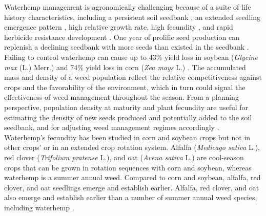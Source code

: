 \documentclass[
]{article}
\begin{document}
Waterhemp management is agronomically challenging because of a suite of life history characteristics, including a persistent soil seedbank \citep{davisWeedSeedPools2008}, an extended seedling emergence pattern \citep{buhlerEmergencePersistenceSeed2001}, high relative growth rate, high fecundity \citep{heneghanGrowthDevelopmentFive2017}, and rapid herbicide resistance development \citep{tranelHerbicideResistanceAmaranthus2021}. One year of prolific seed production can replenish a declining seedbank with more seeds than existed in the seedbank \citep{davisWeedSeedPools2008}. Failing to control waterhemp can cause up to 43\% yield loss in soybean (\emph{Glycine max} (L.) Merr.) \citep{hagerCommonWaterhempAmaranthus2002a} and 74\% yield loss in corn (\emph{Zea mays} L.) \citep{steckelCommonWaterhempAmaranthus2004}. The accumulated mass and density of a weed population reflect the relative competitiveness against crops and the favorability of the environment, which in turn could signal the effectiveness of weed management throughout the season. From a planning perspective, population density at maturity and plant fecundity are useful for estimating the density of new seeds produced and potentially added to the soil seedbank, and for adjusting weed management regimes accordingly \citep{buhlerImplicationsWeedSeedbank1997}. Waterhemp's fecundity has been studied in corn and soybean crops \citep{menalledImpactCompostedSwine2004, nordbyInfluenceCornCommon2004} but not in other crops' or in an extended crop rotation system.
Alfalfa (\emph{Medicago sativa} L.), red clover (\emph{Trifolium pratense} L.), and oat (\emph{Avena sativa} L.) are cool-season crops that can be grown in rotation sequences with corn and soybean, whereas waterhemp is a summer annual weed. Compared to corn and soybean, alfalfa, red clover, and oat seedlings emerge and establish earlier. Alfalfa, red clover, and oat also emerge and establish earlier than a number of summer annual weed species, including waterhemp \citep{buhlerRelativeEmergenceSequence2008, horakGrowthAnalysisFour2000}.
\end{document}
